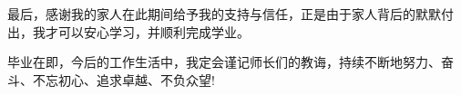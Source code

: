 \documentclass[nomlist,masters,openany]{seuthesix}
\begin{document}
最后，感谢我的家人在此期间给予我的支持与信任，正是由于家人背后的默默付出，我才可以安心学习，并顺利完成学业。

毕业在即，今后的工作生活中，我定会谨记师长们的教诲，持续不断地努力、奋斗、不忘初心、追求卓越、不负众望!

\quad

\quad




\appendix

\end{document}
